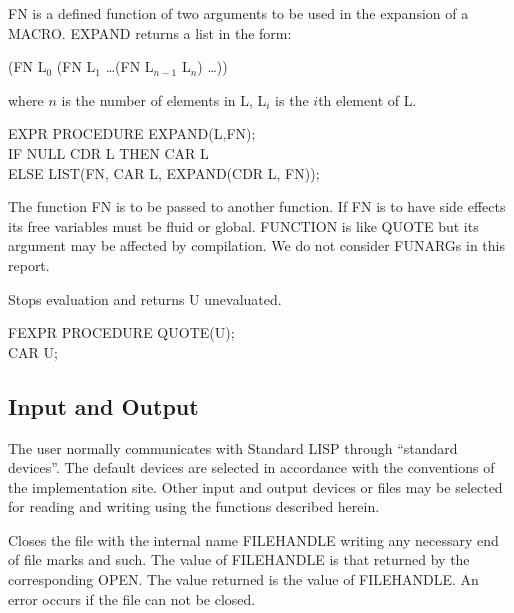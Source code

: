 {FN is a defined function of two arguments to be used in the expansion
of a MACRO. EXPAND returns a list in the form:

\vspace{.15in}
(FN L$_0$ (FN L$_1$ \ldots (FN L$_{n-1}$ L$_n$) \ldots ))
\vspace{.15in}

where $n$ is the number of elements in L, L$_i$ is the $i$th element
of L.

{\tt \begin{tabbing} EXPR PROCEDURE EXPAND(L,FN); \\
\hspace*{1em} IF NULL CDR L THEN CAR L \\
\hspace*{2em} ELSE LIST(FN, CAR L, EXPAND(CDR L, FN));
\end{tabbing}}}

{The function FN is to be passed to another function. If FN is to have
side effects its free variables must be fluid or global. FUNCTION is
like QUOTE but its argument may be affected by compilation. We do not
consider FUNARGs in this report.}


{Stops evaluation and returns U unevaluated.

{\tt \begin{tabbing} FEXPR PROCEDURE QUOTE(U); \\
\hspace*{2em}CAR U;
\end{tabbing}}}

\subsection{Input and Output}
\label{IO}
The user normally communicates with Standard LISP through
``standard devices''. The default devices are selected in accordance
with the conventions of the implementation site. Other input and
output devices or files may be selected for reading and writing using
the functions described herein.



{Closes the file with the internal name FILEHANDLE writing any
necessary end of file marks and such. The value of FILEHANDLE is that
returned by the corresponding OPEN.  The value returned is
the value of FILEHANDLE. An error occurs if the file can not be
 
closed.

}

